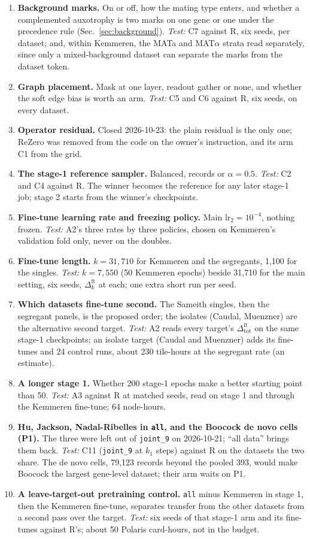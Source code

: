 \begin{enumerate}[leftmargin=*,itemsep=3pt]
statistics.
\item \textbf{Background marks.} On or off, how the mating type enters, and whether a
complemented auxotrophy is two marks on one gene or one under the precedence rule
(Sec.~\ref{sec:background}). \emph{Test:} C7 against R, six seeds, per dataset; and, within
Kemmeren, the MATa and MAT$\alpha$ strata read separately, since only a mixed-background dataset
can separate the marks from the dataset token.
\item \textbf{Graph placement.} Mask at one layer, readout gather or none, and whether the soft
edge bias is worth an arm. \emph{Test:} C5 and C6 against R, six seeds, on every dataset.
\item \textbf{Operator residual.} Closed 2026-10-23: the plain residual is the only one; ReZero
was removed from the code on the owner's instruction, and its arm C1 from the grid.
\item \textbf{The stage-1 reference sampler.} Balanced, records or $\alpha = 0.5$. \emph{Test:} C2
and C4 against R. The winner becomes the reference for any later stage-1 job; stage 2 starts from
the winner's checkpoints.
\item \textbf{Fine-tune learning rate and freezing policy.} Main $\mathrm{lr}_2 = 10^{-4}$, nothing
frozen. \emph{Test:} A2's three rates by three policies, chosen on Kemmeren's validation fold
only, never on the doubles.
\item \textbf{Fine-tune length.} $k = 31{,}710$ for Kemmeren and the segregants, 1{,}100 for the
singles. \emph{Test:} $k = 7{,}550$ (50 Kemmeren epochs) beside 31{,}710 for the main setting,
six seeds, $\Delta^{\mathrm{ft}}_{k}$ at each; one extra short run per seed.
\item \textbf{Which datasets fine-tune second.} The Sameith singles, then the segregant panels,
is the proposed order; the isolates (Caudal, Muenzner) are the alternative second target.
\emph{Test:} A2 reads every target's $\Delta^{\mathrm{ft}}_{\mathrm{tot}}$ on the same stage-1
checkpoints; an isolate target (Caudal and Muenzner) adds its fine-tunes and 24 control runs, about 230 tile-hours at the segregant rate (an estimate).
\item \textbf{A longer stage 1.} Whether 200 stage-1 epochs make a better starting point than 50.
\emph{Test:} A3 against R at matched seeds, read on stage 1 and through the Kemmeren fine-tune;
64 node-hours.
\item \textbf{Hu, Jackson, Nadal-Ribelles in \texttt{all}, and the Boocock de novo cells (P1).}
The three were left out of \texttt{joint\_9} on 2026-10-21; ``all data'' brings them back.
\emph{Test:} C11 (\texttt{joint\_9} at $k_1$ steps) against R on the datasets the two share. The de
novo cells, 79{,}123 records beyond the pooled 393, would make Boocock the largest gene-level
dataset; their arm waits on P1.
\item \textbf{A leave-target-out pretraining control.} \texttt{all} minus Kemmeren in stage 1,
then the Kemmeren fine-tune, separates transfer from the other datasets from a second pass over
the target. \emph{Test:} six seeds of that stage-1 arm and its fine-tunes against R's; about 50
Polaris card-hours, not in the budget.
\end{enumerate}
